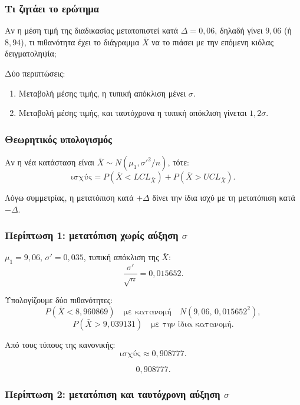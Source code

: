 \documentclass[12pt,a4paper]{article}
\begin{document}
\subsubsection*{Τι ζητάει το ερώτημα}

Αν η μέση τιμή της διαδικασίας μετατοπιστεί κατά \(\Delta=0{,}06\), δηλαδή
γίνει \(9{,}06\) (ή \(8{,}94\)), τι πιθανότητα έχει το διάγραμμα \(\bar X\)
να το πιάσει με την επόμενη κιόλας δειγματοληψία;

Δύο περιπτώσεις:

\begin{enumerate}[leftmargin=2.2em]
    \item Μεταβολή μέσης τιμής, η τυπική απόκλιση μένει \(\sigma\).
    \item Μεταβολή μέσης τιμής, και ταυτόχρονα η τυπική απόκλιση γίνεται
    \(1{,}2\sigma\).
\end{enumerate}

\subsubsection*{Θεωρητικός υπολογισμός}

Αν η νέα κατάσταση είναι \(\bar X\sim N(\mu_1,\sigma'^2/n)\), τότε:
\[
    \text{ισχύς}=P(\bar X<LCL_{\bar X})+P(\bar X>UCL_{\bar X}).
\]

Λόγω συμμετρίας, η μετατόπιση κατά \(+\Delta\) δίνει την ίδια ισχύ με τη
μετατόπιση κατά \(-\Delta\).

\subsubsection*{Περίπτωση 1: μετατόπιση χωρίς αύξηση \(\sigma\)}

\(\mu_1=9{,}06\), \(\sigma'=0{,}035\), τυπική απόκλιση της \(\bar X\):
\[
    \frac{\sigma'}{\sqrt n}=0{,}015652.
\]

Υπολογίζουμε δύο πιθανότητες:
\[
    P(\bar X<8{,}960869)\quad\text{με κατανομή}\quad N(9{,}06,\,0{,}015652^2),
\]
\[
    P(\bar X>9{,}039131)\quad\text{με την ίδια κατανομή}.
\]

Από τους τύπους της κανονικής:
\[
    \text{ισχύς}\approx 0{,}908777.
\]

\[
    \boxed{0{,}908777}.
\]

\subsubsection*{Περίπτωση 2: μετατόπιση και ταυτόχρονη αύξηση \(\sigma\)}
\end{document}
